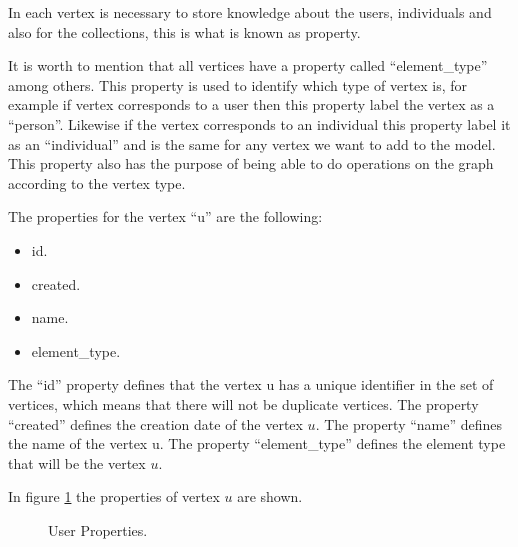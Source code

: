 In each vertex is necessary to store knowledge about the users, individuals and
also for the collections, this is what is known as property.

It is worth to mention that all vertices have a property called “element\_type”
among others. This property is used to identify which type of vertex is, for
example if vertex corresponds to a user then this property label the vertex as a
“person”. Likewise if the vertex corresponds to an individual this property
label it as an “individual” and is the same for any vertex we want to add to the
model. This property also has the purpose of being able to do operations on the
graph according to the vertex type.

The properties for the vertex “u” are the following:

\begin{itemize} 
\item id.  
\item created.
\item name.
\item element\_type.
\end{itemize}

The “id” property defines that the vertex u has a unique identifier in the set
of vertices, which means that there will not be duplicate vertices. The property
“created” defines the creation date of the vertex $u$. The property “name”
defines the name of the vertex u. The property “element\_type” defines the
element type that will be the vertex $u$.

In figure \ref{fig:User_node} the properties of vertex $u$  are shown.

\begin{figure}
\captionsetup{justification=centering,margin=2cm}
\centering
\setlength\fboxsep{0pt}
\setlength\fboxrule{0.7pt}
\caption{User Properties.}
\label{fig:User_node}       
\end{figure}

